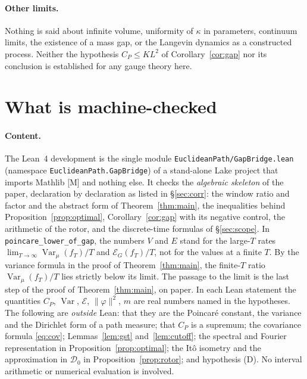 \documentclass[11pt,a4paper]{article}
\theoremstyle{definition}
\theoremstyle{remark}
\newcommand{\Var}{\operatorname{Var}}
\newcommand{\cE}{\mathcal{E}}
\newcommand{\cD}{\mathcal{D}}
\newcommand{\code}[1]{\texttt{#1}}
\begin{document}
\paragraph{Other limits.}
Nothing is said about infinite volume, uniformity of $\kappa$ in parameters, continuum limits, the existence of a mass gap, or the Langevin dynamics as a constructed process.
Neither the hypothesis $C_P\le KL^2$ of Corollary~\ref{cor:gap} nor its conclusion is established for any gauge theory here.

\section{What is machine-checked}\label{sec:lean}

\paragraph{Content.}
The Lean~4 development is the single module \code{EuclideanPath/GapBridge.lean} (namespace \code{EuclideanPath.GapBridge}) of a stand-alone Lake project that imports Mathlib [M] and nothing else.
It checks the \emph{algebraic skeleton} of the paper, declaration by declaration as listed in \S\ref{sec:corr}: the window ratio and factor and the abstract form of Theorem~\ref{thm:main}, the inequalities behind Proposition~\ref{prop:optimal}, Corollary~\ref{cor:gap} with its negative control, the arithmetic of the rotor, and the discrete-time formulas of \S\ref{sec:scope}.
In \code{poincare\_\allowbreak{}lower\_\allowbreak{}of\_\allowbreak{}gap}, the numbers $V$ and $E$ stand for the large-$T$ rates $\lim_{T\to\infty}\Var_\mu(f_T)/T$ and $\cE_G(f_T)/T$, not for the values at a finite $T$.
By the variance formula in the proof of Theorem~\ref{thm:main}, the finite-$T$ ratio $\Var_\mu(f_T)/T$ lies strictly below its limit.
The passage to the limit is the last step of the proof of Theorem~\ref{thm:main}, on paper.
In each Lean statement the quantities $C_P$, $\Var$, $\cE$, $\|\varphi\|^2$, $m$ are real numbers named in the hypotheses.
The following are \emph{outside} Lean: that they are the Poincar\'e constant, the variance and the Dirichlet form of a path measure; that $C_P$ is a supremum; the covariance formula \eqref{eq:cov}; Lemmas~\ref{lem:gst} and~\ref{lem:cutoff}; the spectral and Fourier representation in Proposition~\ref{prop:optimal}; the It\^o isometry and the approximation in $\cD_0$ in Proposition~\ref{prop:rotor}; and hypothesis (D).
No interval arithmetic or numerical evaluation is involved.
\end{document}
